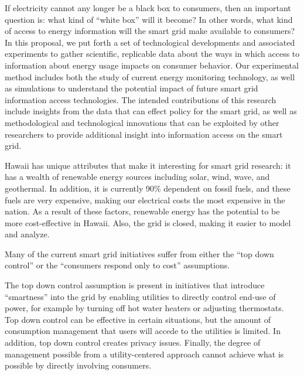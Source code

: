 If electricity cannot any longer be a black box to consumers, then an
important question is: what kind of ``white box'' will it become? In other
words, what kind of access to energy information will the smart grid make
available to consumers? In this proposal, we put forth a set of
technological developments and associated experiments to gather scientific,
replicable data about the ways in which access to information about energy
usage impacts on consumer behavior.  Our experimental method includes both
the study of current energy monitoring technology, as well as simulations
to understand the potential impact of future smart grid information access
technologies.  The intended contributions of this research include insights
from the data that can effect policy for the smart grid, as well as
methodological and technological innovations that can be exploited by other
researchers to provide additional insight into information access on the
smart grid.




























Hawaii has unique attributes that make it interesting for smart grid
research: it has a wealth of renewable energy sources including solar,
wind, wave, and geothermal.  In addition, it is currently 90\% dependent on
fossil fuels, and these fuels are very expensive, making our electrical
costs the most expensive in the nation.  As a result of these factors,
renewable energy has the potential to be more cost-effective in Hawaii.
Also, the grid is closed, making it easier to model and analyze.


Many of the current smart grid initiatives suffer from either the ``top
down control'' or the ``consumers respond only to cost'' assumptions. 

The top down control assumption is present in initiatives that introduce
``smartness'' into the grid by enabling utilities to directly control
end-use of power, for example by turning off hot water heaters or adjusting
thermostats.   Top down control can be effective in certain situations, but
the amount of consumption management that users will accede to the
utilities is limited.  In addition, top down control creates privacy
issues.  Finally, the degree of management possible from a utility-centered
approach cannot achieve what is possible by directly involving consumers. 

